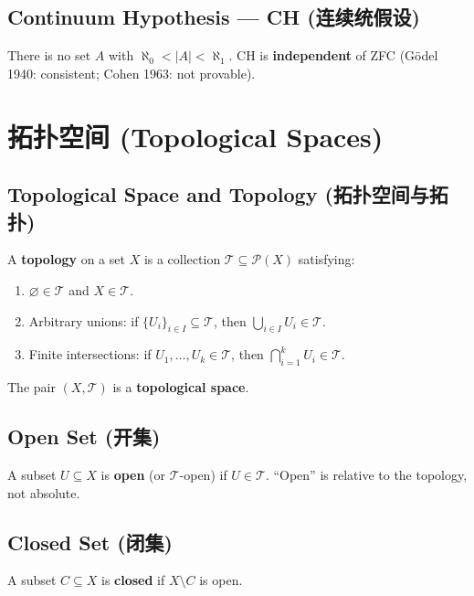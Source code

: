 \documentclass{article}
\begin{document}
\subsection{Continuum Hypothesis --- CH (连续统假设)}\label{def:ch}
There is no set $A$ with $\aleph_0 < |A| < \aleph_1$.
CH is \textbf{independent} of ZFC (G\"odel 1940: consistent; Cohen
1963: not provable).

\section{拓扑空间 (Topological Spaces)}

\subsection{Topological Space and Topology (拓扑空间与拓扑)}\label{def:topology}
\begin{definition}
  A \textbf{topology} on a set $X$ is a collection $\mathcal{T}
  \subseteq \mathcal{P}(X)$ satisfying:
  \begin{enumerate}
    \item $\varnothing \in \mathcal{T}$ and $X \in \mathcal{T}$.
    \item Arbitrary unions: if $\{U_i\}_{i \in I} \subseteq
      \mathcal{T}$, then $\bigcup_{i \in I} U_i \in \mathcal{T}$.
    \item Finite intersections: if $U_1, \ldots, U_k \in
      \mathcal{T}$, then $\bigcap_{i=1}^k U_i \in \mathcal{T}$.
  \end{enumerate}
  The pair $(X, \mathcal{T})$ is a \textbf{topological space}.
\end{definition}

\subsection{Open Set (开集)}\label{def:open}
A subset $U \subseteq X$ is \textbf{open} (or $\mathcal{T}$-open) if
$U \in \mathcal{T}$.
``Open'' is relative to the topology, not absolute.

\subsection{Closed Set (闭集)}\label{def:closed}
A subset $C \subseteq X$ is \textbf{closed} if $X \setminus C$ is open.
\end{document}
